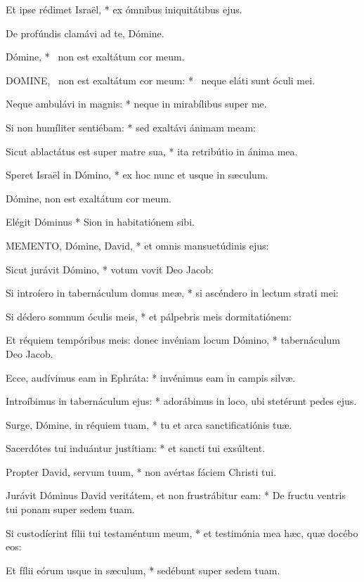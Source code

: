 Et ipse rédimet Israël, * ex ómnibus iniquitátibus ejus.

 De profúndis clamávi ad te, Dómine.

 Dómine, * \textdagger\ non est exaltátum cor meum. \textdaggerdbl


\lettrine[lines=2]{D}{OMINE}, \textdagger\ non est exaltátum cor meum: * \textdaggerdbl\ neque eláti sunt óculi mei.

Neque ambulávi in magnis: * neque in mirabílibus super me.

Si non humíliter sentiébam: * sed exaltávi ánimam meam:

Sicut ablactátus est super matre sua, * ita retribútio in ánima mea.

Speret Israël in Dómino, * ex hoc nunc et usque in sæculum.

 Dómine, non est exaltátum cor meum.

 Elégit Dóminus * Sion in habitatiónem sibi.


\lettrine[lines=2]{M}{EMENTO}, Dómine, David, * et omnis mansuetúdinis ejus:

Sicut jurávit Dómino, * votum vovit Deo Jacob:

Si introíero in tabernáculum domus meæ, * si ascéndero in lectum strati mei:

Si dédero somnum óculis meis, * et pálpebris meis dormitatiónem:

Et réquiem tempóribus meis: donec invéniam locum Dómino, * tabernáculum Deo Jacob.

Ecce, audívimus eam in Ephráta: * invénimus eam in campis silvæ.

Introíbimus in tabernáculum ejus: * adorábimus in loco, ubi stetérunt pedes ejus.

Surge, Dómine, in réquiem tuam, * tu et arca sanctificatiónis tuæ.

Sacerdótes tui induántur justítiam: * et sancti tui exsúltent.

Propter David, servum tuum, * non avértas fáciem Christi tui.

Jurávit Dóminus David veritátem, et non frustrábitur eam: * De fructu ventris tui ponam super sedem tuam.

Si custodíerint fílii tui testaméntum meum, * et testimónia mea hæc, quæ docébo eos:

Et fílii eórum usque in sæculum, * sedébunt super sedem tuam.

